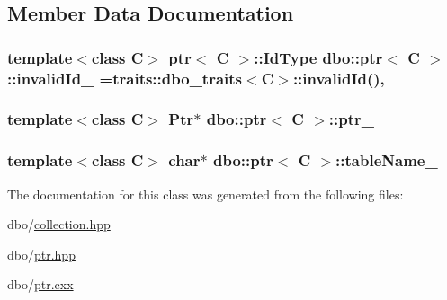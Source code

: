 \subsection{Member Data Documentation}
\hypertarget{classdbo_1_1ptr_a26f06bd10de2444190c904a1814999fa}{
\subsubsection[{invalid\+Id\+\_\+}]{\setlength{\rightskip}{0pt plus 5cm}template$<$class C$>$ {\bf ptr}$<$ C $>$\+::{\bf Id\+Type} {\bf dbo\+::ptr}$<$ C $>$\+::invalid\+Id\+\_\+ ={\bf traits\+::dbo\+\_\+traits}$<$C$>$\+::invalid\+Id()\hspace{0.3cm}{\ttfamily [static]}, {\ttfamily [protected]}}}\label{classdbo_1_1ptr_a26f06bd10de2444190c904a1814999fa}
\hypertarget{classdbo_1_1ptr_a7c58e1f0ae8dcf8a7a9acd6197d2de38}{
\subsubsection[{ptr\+\_\+}]{\setlength{\rightskip}{0pt plus 5cm}template$<$class C$>$ {\bf Ptr}$\ast$ {\bf dbo\+::ptr}$<$ C $>$\+::ptr\+\_\+\hspace{0.3cm}{\ttfamily [protected]}}}\label{classdbo_1_1ptr_a7c58e1f0ae8dcf8a7a9acd6197d2de38}
\hypertarget{classdbo_1_1ptr_aa021e5c70d53414dfbb3139ce3661b9d}{
\subsubsection[{table\+Name\+\_\+}]{\setlength{\rightskip}{0pt plus 5cm}template$<$class C$>$ char$\ast$ {\bf dbo\+::ptr}$<$ C $>$\+::table\+Name\+\_\+\hspace{0.3cm}{\ttfamily [protected]}}}\label{classdbo_1_1ptr_aa021e5c70d53414dfbb3139ce3661b9d}


The documentation for this class was generated from the following files\+:\begin{DoxyCompactItemize}
\item 
dbo/\hyperlink{collection_8hpp}{collection.\+hpp}\item 
dbo/\hyperlink{ptr_8hpp}{ptr.\+hpp}\item 
dbo/\hyperlink{ptr_8cxx}{ptr.\+cxx}\end{DoxyCompactItemize}
